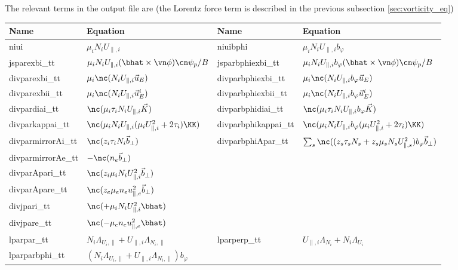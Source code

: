 The relevant terms in the output file are (the Lorentz force term is described in the previous subsection \ref{sec:vorticity_eq})
\begin{longtable}{llll}
\toprule
\rowcolor{gray!50}\textbf{Name} &  \textbf{Equation} &
\textbf{Name} &  \textbf{Equation}\\
\midrule
    niui &$\mu_i N_i U_{\parallel,i}$ &
    niuibphi &$\mu_i N_iU_{\parallel,i}b_\varphi$ \\
    jsparexbi\_tt       & $\mu_i N_iU_{\parallel,i}(\bhat\times\vn\phi)\cn \psi_p/B$ &
    jsparbphiexbi\_tt   & $\mu_i N_iU_{\parallel,i}b_\varphi(\bhat\times\vn\phi)\cn \psi_p/B$ \\
    divparexbi\_tt       & $\mu_i \nc (N_iU_{\parallel,i}\vec u_E)$ &
    divparbphiexbi\_tt   & $\mu_i\nc( N_iU_{\parallel,i}b_\varphi \vec u_E)$ \\
    divparexbii\_tt       & $\mu_i \nc (N_iU_{\parallel,i}\vec u_E^i)$ &
    divparbphiexbii\_tt   & $\mu_i\nc( N_iU_{\parallel,i}b_\varphi \vec u_E^i)$ \\
    divpardiai\_tt       & $\nc(\mu_i \tau_i N_iU_{\parallel,i}\vec K)$ &
    divparbphidiai\_tt   & $\nc ( \mu_i \tau_i N_iU_{\parallel,i}b_\varphi\vec K)$ \\
    divparkappai\_tt       & $\nc (\mu_i N_iU_{\parallel,i} ( \mu_i U_{\parallel,i}^2 + 2\tau_i)\KK )$ &
    divparbphikappai\_tt       & $\nc( \mu_i N_iU_{\parallel,i}b_\varphi ( \mu_i U_{\parallel,i}^2 + 2\tau_i)\KK)$ \\
    divparmirrorAi\_tt       & $\nc(z_i \tau_i N_i \vec b_\perp)$ &
    divparbphiApar\_tt   & $\sum_s \nc ((z_s \tau_s N_s + z_s \mu_s N_s U_{\parallel,s}^2)b_\varphi \vec b_\perp)$ \\
    divparmirrorAe\_tt       & $-\nc ( n_e \vec b_\perp)$ &
    & \\
    divparApari\_tt       & $\nc( z_i \mu_i N_i U_{\parallel,i}^2\vec b_\perp)$ &
    & \\
    divparApare\_tt       & $\nc( z_e \mu_e n_e u_{\parallel,e}^2\vec b_\perp)$ &
    & \\
    divjpari\_tt & $ \nc( +\mu_i N_i U_{\parallel,i}^2 \bhat)$ &
    & \\
    divjpare\_tt & $ \nc( -\mu_e n_e u_{\parallel,e}^2 \bhat)$ &
    & \\
    lparpar\_tt   & $N_i \Lambda_{U_i,\parallel} + U_{\parallel,i} \Lambda_{N_i,\parallel}$ &
    lparperp\_tt & $U_{\parallel,i} \Lambda_{N_i} + N_i\Lambda_{U_i} $ \\
    lparparbphi\_tt   & $(N_i \Lambda_{U_i,\parallel} + U_{\parallel,i} \Lambda_{N_i,\parallel})b_\varphi$ &

\end{longtable}
